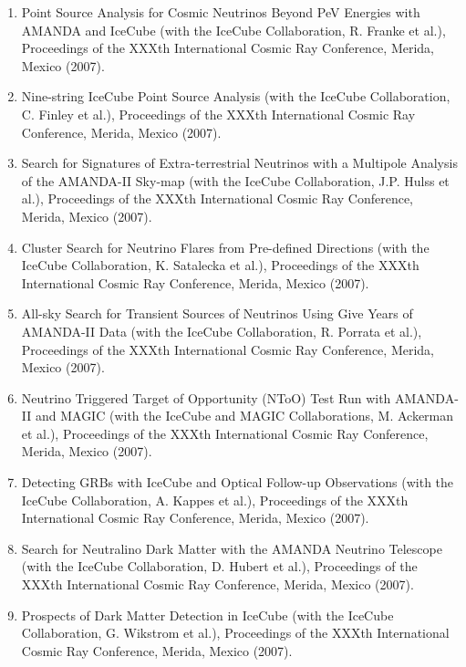 \begin{enumerate}
\item Point Source Analysis for Cosmic Neutrinos Beyond PeV Energies with AMANDA and IceCube (with the IceCube Collaboration, R. Franke et al.), Proceedings of the XXXth International Cosmic Ray Conference, Merida, Mexico (2007).

\item Nine-string IceCube Point Source Analysis (with the IceCube Collaboration, C. Finley et al.), Proceedings of the XXXth International Cosmic Ray Conference, Merida, Mexico (2007).

\item Search for Signatures of Extra-terrestrial Neutrinos with a Multipole Analysis of the AMANDA-II Sky-map (with the IceCube Collaboration, J.P. Hulss et al.), Proceedings of the XXXth International Cosmic Ray Conference, Merida, Mexico (2007).

\item Cluster Search for Neutrino Flares from Pre-defined Directions (with the IceCube Collaboration, K. Satalecka et al.), Proceedings of the XXXth International Cosmic Ray Conference, Merida, Mexico (2007).

\item All-sky Search for Transient Sources of Neutrinos Using Give Years of AMANDA-II Data (with the IceCube Collaboration, R. Porrata et al.), Proceedings of the XXXth International Cosmic Ray Conference, Merida, Mexico (2007).

\item Neutrino Triggered Target of Opportunity (NToO) Test Run with AMANDA-II and MAGIC (with the IceCube and MAGIC Collaborations, M. Ackerman et al.), Proceedings of the XXXth International Cosmic Ray Conference, Merida, Mexico (2007).

\item Detecting GRBs with IceCube and Optical Follow-up Observations (with the IceCube Collaboration, A. Kappes et al.), Proceedings of the XXXth International Cosmic Ray Conference, Merida, Mexico (2007).

\item Search for Neutralino Dark Matter with the AMANDA Neutrino Telescope (with the IceCube Collaboration, D. Hubert et al.), Proceedings of the XXXth International Cosmic Ray Conference, Merida, Mexico (2007).

\item Prospects of Dark Matter Detection in IceCube (with the IceCube Collaboration, G. Wikstrom et al.), Proceedings of the XXXth International Cosmic Ray Conference, Merida, Mexico (2007).


\end{enumerate}

